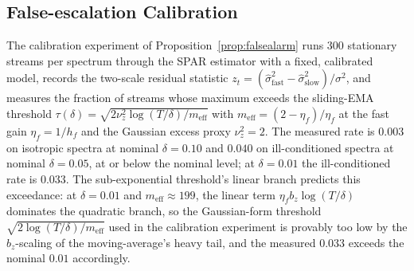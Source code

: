 \documentclass[11pt]{article}
\begin{document}
\subsection{False-escalation Calibration}
The calibration experiment of Proposition~\ref{prop:falsealarm} runs 300 stationary streams per spectrum through the SPAR estimator with a fixed, calibrated model, records the two-scale residual statistic $z_t = (\widehat\sigma^2_{\mathrm{fast}} - \widehat\sigma^2_{\mathrm{slow}})/\sigma^2$, and measures the fraction of streams whose maximum exceeds the sliding-EMA threshold $\tau(\delta) = \sqrt{2\nu_z^2\log(T/\delta)/m_{\mathrm{eff}}}$ with $m_{\mathrm{eff}} = (2-\eta_f)/\eta_f$ at the fast gain $\eta_f = 1/h_f$ and the Gaussian excess proxy $\nu_z^2 = 2$.
The measured rate is $0.003$ on isotropic spectra at nominal $\delta = 0.10$ and $0.040$ on ill-conditioned spectra at nominal $\delta = 0.05$, at or below the nominal level; at $\delta = 0.01$ the ill-conditioned rate is $0.033$. The sub-exponential threshold's linear branch predicts this exceedance: at $\delta = 0.01$ and $m_{\mathrm{eff}} \approx 199$, the linear term $\eta_f b_z \log(T/\delta)$ dominates the quadratic branch, so the Gaussian-form threshold $\sqrt{2\log(T/\delta)/m_{\mathrm{eff}}}$ used in the calibration experiment is provably too low by the $b_z$-scaling of the moving-average's heavy tail, and the measured $0.033$ exceeds the nominal $0.01$ accordingly.
\end{document}
